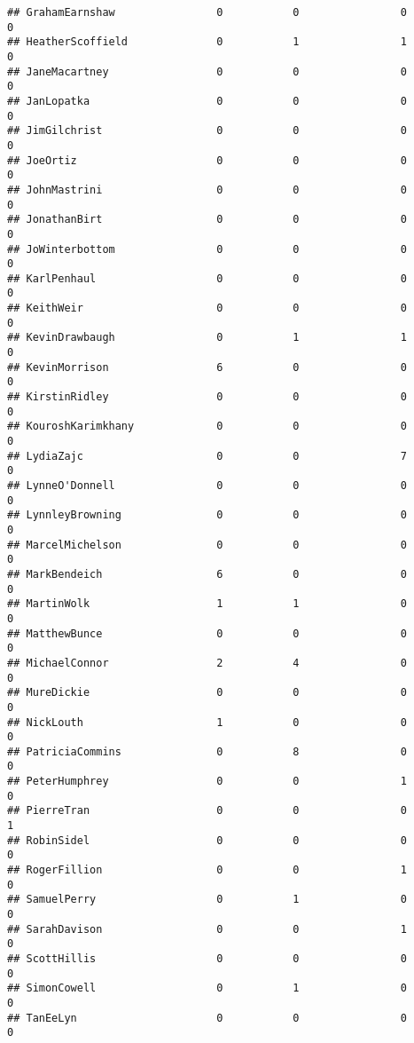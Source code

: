 \documentclass[
  12pt,
]{article}
\begin{document}
\begin{verbatim}
## GrahamEarnshaw                0           0                0           0
## HeatherScoffield              0           1                1           0
## JaneMacartney                 0           0                0           0
## JanLopatka                    0           0                0           0
## JimGilchrist                  0           0                0           0
## JoeOrtiz                      0           0                0           0
## JohnMastrini                  0           0                0           0
## JonathanBirt                  0           0                0           0
## JoWinterbottom                0           0                0           0
## KarlPenhaul                   0           0                0           0
## KeithWeir                     0           0                0           0
## KevinDrawbaugh                0           1                1           0
## KevinMorrison                 6           0                0           0
## KirstinRidley                 0           0                0           0
## KouroshKarimkhany             0           0                0           0
## LydiaZajc                     0           0                7           0
## LynneO'Donnell                0           0                0           0
## LynnleyBrowning               0           0                0           0
## MarcelMichelson               0           0                0           0
## MarkBendeich                  6           0                0           0
## MartinWolk                    1           1                0           0
## MatthewBunce                  0           0                0           0
## MichaelConnor                 2           4                0           0
## MureDickie                    0           0                0           0
## NickLouth                     1           0                0           0
## PatriciaCommins               0           8                0           0
## PeterHumphrey                 0           0                1           0
## PierreTran                    0           0                0           1
## RobinSidel                    0           0                0           0
## RogerFillion                  0           0                1           0
## SamuelPerry                   0           1                0           0
## SarahDavison                  0           0                1           0
## ScottHillis                   0           0                0           0
## SimonCowell                   0           1                0           0
## TanEeLyn                      0           0                0           0

\end{verbatim}
\end{document}

